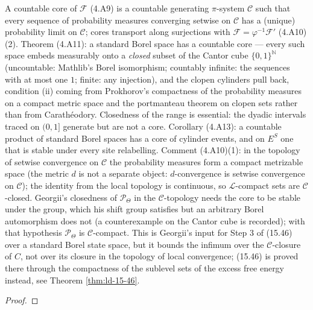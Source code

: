 \begin{theorem}
    A countable core of $\mathcal F$ (4.A9) is a countable generating $\pi$-system $\mathcal C$
    such that every sequence of probability measures converging setwise on $\mathcal C$ has a
    (unique) probability limit on $\mathcal C$; cores transport along surjections with
    $\mathcal F = \varphi^{-1}\mathcal F'$ (4.A10)(2). Theorem (4.A11): a standard Borel space has
    a countable core --- every such space embeds measurably onto a \emph{closed} subset of the
    Cantor cube $\{0,1\}^{\mathbb N}$ (uncountable: Mathlib's Borel isomorphism; countably
    infinite: the sequences with at most one $1$; finite: any injection), and the clopen
    cylinders pull back, condition (ii) coming from Prokhorov's compactness of the probability
    measures on a compact metric space and the portmanteau theorem on clopen sets rather than
    from Carath\'eodory. Closedness of the range is essential: the dyadic intervals traced on
    $(0,1]$ generate but are not a core. Corollary (4.A13): a countable product of standard Borel
    spaces has a core of cylinder events, and on $E^S$ one that is stable under every site
    relabelling. Comment (4.A10)(1): in the topology of setwise convergence on $\mathcal C$ the
    probability measures form a compact metrizable space (the metric $d$ is not a separate
    object: $d$-convergence is setwise convergence on $\mathcal C$); the identity from the local
    topology is continuous, so $\mathcal L$-compact sets are $\mathcal C$-closed. Georgii's
    closedness of $\mathcal P_\Theta$ in the $\mathcal C$-topology needs the core to be stable
    under the group, which his shift group satisfies but an arbitrary Borel automorphism does not
    (a counterexample on the Cantor cube is recorded); with that hypothesis $\mathcal P_\Theta$ is
    $\mathcal C$-compact. This is Georgii's input for Step 3 of (15.46) over a standard Borel
    state space, but it bounds the infimum over the $\mathcal C$-closure of $C$, not over its closure
    in the topology of local convergence; (15.46) is proved there through the compactness of the
    sublevel sets of the excess free energy instead, see Theorem \ref{thm:ld-15-46}.
\end{theorem}
\begin{proof}
    \leanok
\end{proof}
